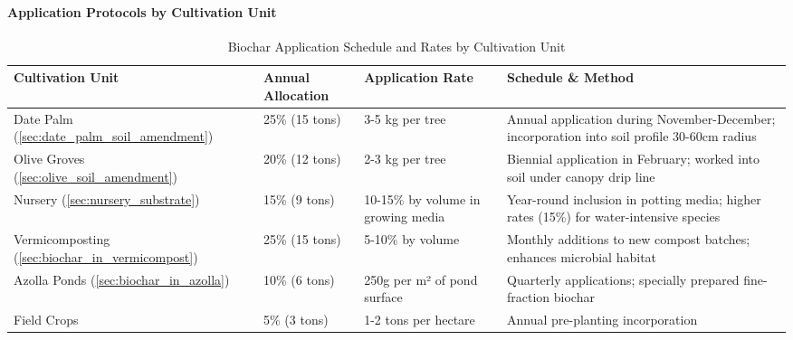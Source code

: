 \paragraph{Application Protocols by Cultivation Unit}
\label{sec:biochar_application}
\begin{table}[h]
\centering
\caption{Biochar Application Schedule and Rates by Cultivation Unit}
\label{tab:biochar_application}
\begin{tabular}{|p{4cm}|p{2cm}|p{2.5cm}|p{5cm}|}
\hline
\textbf{Cultivation Unit} & \textbf{Annual Allocation} & \textbf{Application Rate} & \textbf{Schedule \& Method} \\
\hline
Date Palm (\ref{sec:date_palm_soil_amendment}) & 25\% (15 tons) & 3-5 kg per tree & Annual application during November-December; incorporation into soil profile 30-60cm radius \\
\hline
Olive Groves (\ref{sec:olive_soil_amendment}) & 20\% (12 tons) & 2-3 kg per tree & Biennial application in February; worked into soil under canopy drip line \\
\hline
Nursery (\ref{sec:nursery_substrate}) & 15\% (9 tons) & 10-15\% by volume in growing media & Year-round inclusion in potting media; higher rates (15\%) for water-intensive species \\
\hline
Vermicomposting (\ref{sec:biochar_in_vermicompost}) & 25\% (15 tons) & 5-10\% by volume & Monthly additions to new compost batches; enhances microbial habitat \\
\hline
Azolla Ponds (\ref{sec:biochar_in_azolla}) & 10\% (6 tons) & 250g per m² of pond surface & Quarterly applications; specially prepared fine-fraction biochar \\
\hline
Field Crops & 5\% (3 tons) & 1-2 tons per hectare & Annual pre-planting incorporation \\
\hline
\end{tabular}
\end{table}

